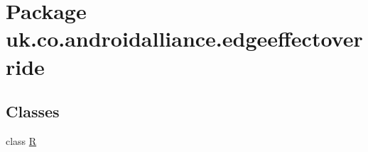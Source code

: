 \hypertarget{namespaceuk_1_1co_1_1androidalliance_1_1edgeeffectoverride}{}\section{Package uk.\+co.\+androidalliance.\+edgeeffectoverride}
\label{namespaceuk_1_1co_1_1androidalliance_1_1edgeeffectoverride}
\subsection*{Classes}
\begin{DoxyCompactItemize}
\item 
class \hyperlink{classuk_1_1co_1_1androidalliance_1_1edgeeffectoverride_1_1_r}{R}
\end{DoxyCompactItemize}
